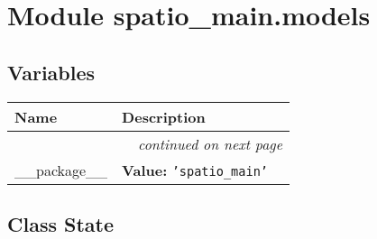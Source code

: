 %
%
%


\section{Module spatio\_main.models}

    \label{spatio_main:models}


  \subsection{Variables}

    \vspace{-1cm}
\hspace{\varindent}\begin{longtable}{|p{\varnamewidth}|p{\vardescrwidth}|l}
\cline{1-2}
\cline{1-2} \centering \textbf{Name} & \centering \textbf{Description}& \\
\cline{1-2}
\endhead\cline{1-2}\multicolumn{3}{r}{\small\textit{continued on next page}}\\\endfoot\cline{1-2}
\endlastfoot\raggedright \_\-\_\-p\-a\-c\-k\-a\-g\-e\-\_\-\_\- & \raggedright \textbf{Value:} 
{\tt \texttt{'}\texttt{spatio\_main}\texttt{'}}&\\
\cline{1-2}
\end{longtable}



\subsection{Class State}

